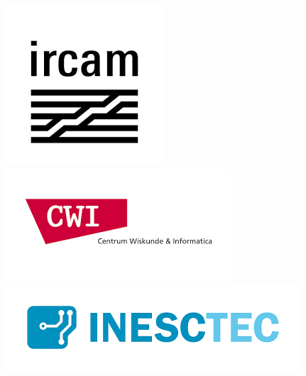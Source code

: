 \begin{figure}[ht]
\begin{minipage}[b]{0.06\linewidth}
            \includegraphics[width=\linewidth]{images/ircam.png}
        \end{minipage}
        \hfill
        \begin{minipage}[b]{0.06\linewidth}
            \includegraphics[width=\linewidth]{images/cwi.png}
        \end{minipage}
        \hfill
        \begin{minipage}[b]{0.06\linewidth}
            \includegraphics[width=\linewidth]{images/inect-tec.png}

\end{minipage}
\end{figure}
